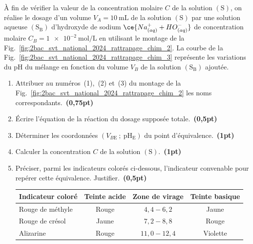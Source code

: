 \begin{minipage}[t][][t]{0.70\linewidth}
    À fin de vérifier la valeur de la concentration molaire $C$ de la solution
    $\mathrm{(S)}$, on réalise le dosage d'un volume $V_{A}=\qty{10}{\mL}$ de la
    solution $\mathrm{(S)}$ par une solution aqueuse $\mathrm{(S_{B})}$
    d'hydroxyde de sodium $\ce{Na^+_{(aq)} + HO^-_{(aq)}}$ de concentration
    molaire ${C_{B}=\qty{1e-2}{\mol\per\L}}$ en utilisant le montage de la
    Fig.~\ref{fig:2bac_svt_national_2024_rattrapage_chim_2}.  La courbe de la
    Fig.~\ref{fig:2bac_svt_national_2024_rattrapage_chim_3} représente les
    variations du $\mathrm{pH}$ du mélange en fonction du volume $V_{B}$ de la
    solution $\mathrm{(S_{B})}$ ajoutée.

    \begin{enumerate}
        \item Attribuer au numéros~(1),~(2) et~(3) du montage de la
              Fig.~\ref{fig:2bac_svt_national_2024_rattrapage_chim_2} les noms
              correspondants.~\textbf{(0,75pt)}
        \item Écrire l'équation de la réaction du dosage supposée
              totale.~\textbf{(0,5pt)}
        \item Déterminer les coordonnées ${(V_{B\mathrm{E}}~;~\mathrm{pH_{E}})}$
              du point d'équivalence.~\textbf{(1pt)}
        \item Calculer la concentration $C$ de la solution
              $\mathrm{(S)}$.~\textbf{(1pt)}
        \item Préciser, parmi les indicateurs colorés ci-dessous,
              l'indicateur convenable pour repérer cette équivalence.
              Justifier.~\textbf{(0,5pt)}
    
              \begin{minipage}{\linewidth}
                  \begin{table}[H]
                      \centering
                      \renewcommand{\arraystretch}{1.1}
                      \begin{tabularx}{\textwidth}{|p{4cm}|C|C|C|}
                          \hline
                          \textbf{Indicateur coloré} &
                          \textbf{Teinte acide} &
                          \textbf{Zone de virage} &
                          \textbf{Teinte basique} \\
                          \hline
                          Rouge de méthyle & Rouge & $4,4-6,2$ & Jaune \\
                          \hline
                          Rouge de crésol & Jaune & $7,2-8,8$ & Rouge \\
                          \hline
                          Alizarine & Rouge & $11,0-12,4$ & Violette \\
                          \hline
                      \end{tabularx}
                  \end{table}
              \end{minipage}
    \end{enumerate}
    
\end{minipage}
